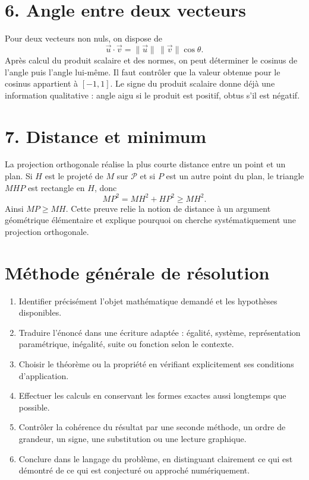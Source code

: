 \section{6. Angle entre deux vecteurs}
Pour deux vecteurs non nuls, on dispose de
\[
\vec u\cdot\vec v=\|\vec u\|\,\|\vec v\|\cos\theta.
\]
Après calcul du produit scalaire et des normes, on peut déterminer le cosinus de l'angle puis l'angle lui-même. Il faut contrôler que la valeur obtenue pour le cosinus appartient à $[-1,1]$. Le signe du produit scalaire donne déjà une information qualitative : angle aigu si le produit est positif, obtus s'il est négatif.

\section{7. Distance et minimum}
La projection orthogonale réalise la plus courte distance entre un point et un plan. Si $H$ est le projeté de $M$ sur $\mathcal P$ et si $P$ est un autre point du plan, le triangle $MHP$ est rectangle en $H$, donc
\[
MP^2=MH^2+HP^2\ge MH^2.
\]
Ainsi $MP\ge MH$. Cette preuve relie la notion de distance à un argument géométrique élémentaire et explique pourquoi on cherche systématiquement une projection orthogonale.


\section{Méthode générale de résolution}
\begin{methode}
\begin{enumerate}
\item Identifier précisément l'objet mathématique demandé et les hypothèses disponibles.
\item Traduire l'énoncé dans une écriture adaptée : égalité, système, représentation paramétrique, inégalité, suite ou fonction selon le contexte.
\item Choisir le théorème ou la propriété en vérifiant explicitement ses conditions d'application.
\item Effectuer les calculs en conservant les formes exactes aussi longtemps que possible.
\item Contrôler la cohérence du résultat par une seconde méthode, un ordre de grandeur, un signe, une substitution ou une lecture graphique.
\item Conclure dans le langage du problème, en distinguant clairement ce qui est démontré de ce qui est conjecturé ou approché numériquement.
\end{enumerate}
\end{methode}

